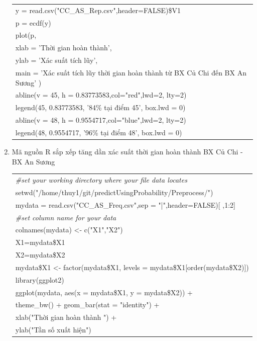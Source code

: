 \documentclass[a4paper, 13pt]{report}
\begin{document}
\begin{enumerate}[label=\textbf{PL\arabic*}]
\begin{flushleft}
\begin{tabular}{ |l| }
y = read.csv("CC\_AS\_Rep.csv",header=FALSE)\$V1\\
p = ecdf(y)\\
plot(p,\\
\hspace{1cm} xlab = 'Thời gian hoàn thành', \\
\hspace{1cm} ylab = 'Xác suất tích lũy', \\
\hspace{1cm} main = 'Xác suất tích lũy thời gian hoàn thành từ BX Củ Chi đến BX An Sương'
)\\
abline(v = 45, h = 0.83773583,col="red",lwd=2, lty=2)\\
legend(45, 0.83773583, '84\% tại điểm 45', box.lwd = 0)\\
abline(v = 48, h = 0.9554717,col="blue",lwd=2, lty=2)\\
legend(48, 0.9554717, '96\% tại điểm 48', box.lwd = 0)\\ 
\hline
\end{tabular}
\end{flushleft}
\item \label{sapxepTGHT} Mã nguồn R sắp xếp tăng dần xác suất thời gian hoàn thành BX Củ Chi - BX An Sương\\
\begin{flushleft}
\begin{tabular}{ |l| }
\hline
\textit{\#set your working directory where your file data locates}\\
setwd("/home/thuy1/git/predictUsingProbability/Preprocess/")\\
mydata = read.csv("CC\_AS\_Freq.csv",sep = "|",header=FALSE)[ ,1:2]\\
\textit{\#set column name for your data}\\
colnames(mydata) <- c("X1","X2")\\
X1=mydata\$X1\\
X2=mydata\$X2\\
mydata\$X1 <- factor(mydata\$X1, levels = mydata\$X1[order(mydata\$X2)])\\
library(ggplot2)\\
ggplot(mydata, aes(x = mydata\$X1, y = mydata\$X2)) +\\
\hspace{1cm} theme\_bw() + geom\_bar(stat = "identity") + \\
\hspace{1cm} xlab("Thời gian hoàn thành ") +\\
\hspace{1cm} ylab("Tần số xuất hiện") \\
\hline
\end{tabular}
\end{flushleft}


\end{enumerate}
\end{document}
